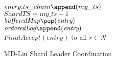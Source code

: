 \begin{algorithm}[!tb]
{{                $entry.ts\_chain\append(my\_ts)$\\
                \label{ts_assignment_pt2}
                $\textit{ShardTS} = \textit{my\_ts}+1$\\
            $\textit{bufferedMap}\pop(\textit{entry})$\\
            $\textit{orderedLog}\append(\textit{entry})$\\
            \Send $\textit{FinalAccept}(\textit{entry})$ to all $r \in \mathcal{R}$\\            
        }
    
    }
    \caption{MD-Lin Shard Leader Coordination}
    \label{shardprotocolcoord}
\end{algorithm}


